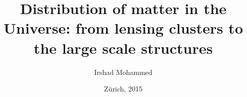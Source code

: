 


\title{Distribution of matter in the Universe: from lensing clusters
to the large scale structures}

\author{Irshad Mohammed}






\date{Z\"urich, 2015}

